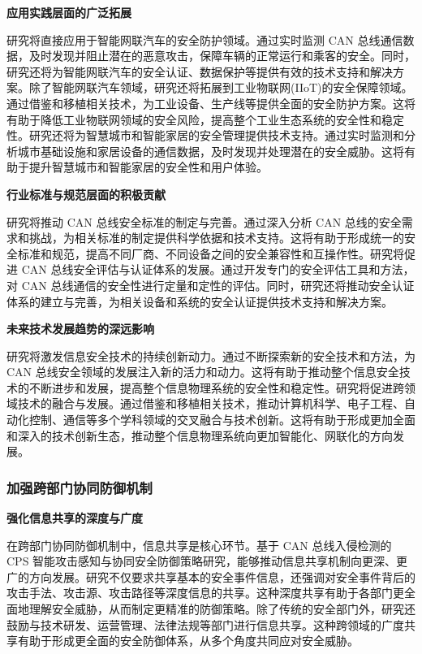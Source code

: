 \textbf{应用实践层面的广泛拓展}

研究将直接应用于智能网联汽车的安全防护领域。通过实时监测 CAN 总线通信数据，及时发现并阻止潜在的恶意攻击，保障车辆的正常运行和乘客的安全。同时，研究还将为智能网联汽车的安全认证、数据保护等提供有效的技术支持和解决方案。除了智能网联汽车领域，研究还将拓展到工业物联网(IIoT)的安全保障领域。通过借鉴和移植相关技术，为工业设备、生产线等提供全面的安全防护方案。这将有助于降低工业物联网领域的安全风险，提高整个工业生态系统的安全性和稳定性。研究还将为智慧城市和智能家居的安全管理提供技术支持。通过实时监测和分析城市基础设施和家居设备的通信数据，及时发现并处理潜在的安全威胁。这将有助于提升智慧城市和智能家居的安全性和用户体验。

\textbf{行业标准与规范层面的积极贡献}

研究将推动 CAN 总线安全标准的制定与完善。通过深入分析 CAN 总线的安全需求和挑战，为相关标准的制定提供科学依据和技术支持。这将有助于形成统一的安全标准和规范，提高不同厂商、不同设备之间的安全兼容性和互操作性。研究将促进 CAN 总线安全评估与认证体系的发展。通过开发专门的安全评估工具和方法，对 CAN 总线通信的安全性进行定量和定性的评估。同时，研究还将推动安全认证体系的建立与完善，为相关设备和系统的安全认证提供技术支持和解决方案。

\textbf{未来技术发展趋势的深远影响}

研究将激发信息安全技术的持续创新动力。通过不断探索新的安全技术和方法，为 CAN 总线安全领域的发展注入新的活力和动力。这将有助于推动整个信息安全技术的不断进步和发展，提高整个信息物理系统的安全性和稳定性。研究将促进跨领域技术的融合与发展。通过借鉴和移植相关技术，推动计算机科学、电子工程、自动化控制、通信等多个学科领域的交叉融合与技术创新。这将有助于形成更加全面和深入的技术创新生态，推动整个信息物理系统向更加智能化、网联化的方向发展。

\subsubsection{加强跨部门协同防御机制}

\textbf{强化信息共享的深度与广度}

在跨部门协同防御机制中，信息共享是核心环节。基于 CAN 总线入侵检测的 CPS 智能攻击感知与协同安全防御策略研究，能够推动信息共享机制向更深、更广的方向发展。研究不仅要求共享基本的安全事件信息，还强调对安全事件背后的攻击手法、攻击源、攻击路径等深度信息的共享。这种深度共享有助于各部门更全面地理解安全威胁，从而制定更精准的防御策略。除了传统的安全部门外，研究还鼓励与技术研发、运营管理、法律法规等部门进行信息共享。这种跨领域的广度共享有助于形成更全面的安全防御体系，从多个角度共同应对安全威胁。

